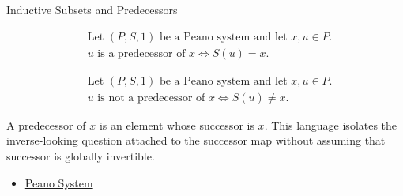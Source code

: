 \begin{topicbox}{Inductive Subsets and Predecessors}
\begin{remark*}
\[
\begin{aligned}
&\text{Let } (P,S,1) \text{ be a Peano system and let } x,u \in P.\\
&u \text{ is a predecessor of } x
\Longleftrightarrow
S(u)=x.
\end{aligned}
\]
\end{remark*}

\begin{remark*}
\[
\begin{aligned}
&\text{Let } (P,S,1) \text{ be a Peano system and let } x,u \in P.\\
&u \text{ is not a predecessor of } x
\Longleftrightarrow
S(u) \neq x.
\end{aligned}
\]
\end{remark*}

\begin{remark*}[Interpretation]
A predecessor of $x$ is an element whose successor is $x$. This language
isolates the inverse-looking question attached to the successor map without
assuming that successor is globally invertible.
\end{remark*}

\begin{dependencies}
\begin{itemize}
  \item \hyperref[def:peano-system]{Peano System}
\end{itemize}
\end{dependencies}
\end{topicbox}

